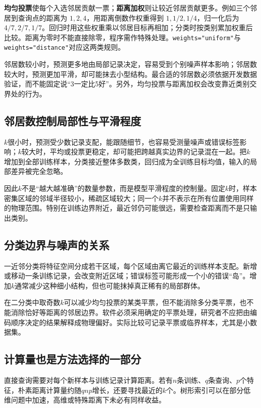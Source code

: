 \textbf{均匀投票}使每个入选邻居贡献一票；\textbf{距离加权}则让较近邻居贡献更多。例如三个邻居到查询点的距离为 $1,2,4$，用距离倒数作权重得到 $1,1/2,1/4$，归一化后为 $4/7,2/7,1/7$。回归时用这些权重乘以邻居目标再相加；分类时按类别累加权重后比较。距离为零时不能直接除零，程序需作特殊处理。\texttt{weights="uniform"}与\texttt{weights="distance"}对应这两类规则。

邻居数较小时，预测更多地由局部记录决定，容易受到个别噪声样本影响；邻居数较大时，预测更加平滑，却可能抹去小型结构。最合适的邻居数必须依据开发数据验证，而不能固定说“3一定比5好”。另外，均匀投票与距离加权会改变靠近类别交界处的行为。


\subsection{邻居数控制局部性与平滑程度}
$k$很小时，预测受少数记录支配，能跟随细节，也容易受测量噪声或错误标签影响；$k$较大时，平均或投票更稳定，却可能把跨越真实边界的记录混在一起。把$k$增加到全部训练样本，分类接近整体多数类，回归成为全训练目标均值，输入的局部差异被完全忽略。

因此$k$不是“越大越准确”的数量参数，而是模型平滑程度的控制量。固定$k$时，样本密集区域的邻域半径较小，稀疏区域较大；同一个$k$并不表示在所有位置使用同样的物理范围。特别在训练边界附近，最近邻仍可能很远，需要检查距离而不是只输出类别。

\subsection{分类边界与噪声的关系}
一近邻分类将特征空间分成若干区域，每个区域由离它最近的训练样本支配。新增或移动一条训练记录，会改变附近区域；错误标签可能形成一个小的错误“岛”。增加$k$通常减少这种细小结构，但也可能抹掉真正稀有的局部群体。

在二分类中取奇数$k$可以减少均匀投票的某类平票，但不能消除多分类平票，也不能消除恰好等距离的邻居边界。软件必须采用确定的平票处理，研究者不应把由编码顺序决定的结果解释成物理偏好。实际比较可记录平票或临界样本，尤其是小数据集。

\subsection{计算量也是方法选择的一部分}
直接查询需要对每个新样本与训练记录计算距离。若有$n$条训练、$q$条查询、$p$个特征，朴素距离计算量约随$qnp$增长，还要寻找最近的$k$个。树形索引可以在部分低维问题中加速，高维或特殊距离下未必有同样收益。

